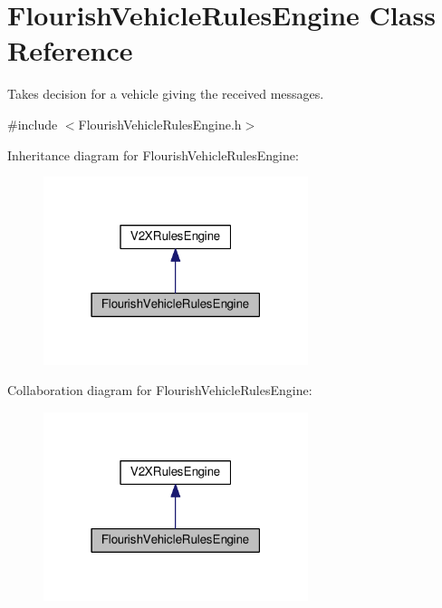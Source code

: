 \hypertarget{classFlourishVehicleRulesEngine}{}\section{Flourish\+Vehicle\+Rules\+Engine Class Reference}
\label{classFlourishVehicleRulesEngine}


Takes decision for a vehicle giving the received messages.  




{\ttfamily \#include $<$Flourish\+Vehicle\+Rules\+Engine.\+h$>$}



Inheritance diagram for Flourish\+Vehicle\+Rules\+Engine\+:\nopagebreak
\begin{figure}[H]
\begin{center}
\leavevmode
\includegraphics[width=219pt]{classFlourishVehicleRulesEngine__inherit__graph}
\end{center}
\end{figure}


Collaboration diagram for Flourish\+Vehicle\+Rules\+Engine\+:\nopagebreak
\begin{figure}[H]
\begin{center}
\leavevmode
\includegraphics[width=219pt]{classFlourishVehicleRulesEngine__coll__graph}
\end{center}
\end{figure}
